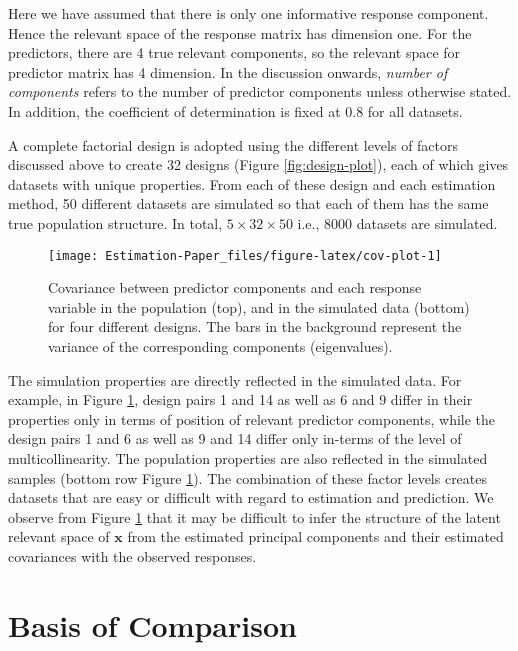 \documentclass[12pt,3p,authoryear]{elsarticle}
\begin{document}
Here we have assumed that there is only one informative response component. Hence the relevant space of the response matrix has dimension one. For the predictors, there are 4 true relevant components, so the relevant space for predictor matrix has 4 dimension. In the discussion onwards, \emph{number of components} refers to the number of predictor components unless otherwise stated. In addition, the coefficient of determination is fixed at 0.8 for all datasets.

A complete factorial design is adopted using the different levels of factors discussed above to create 32 designs (Figure \ref{fig:design-plot}), each of which gives datasets with unique properties. From each of these design and each estimation method, 50 different datasets are simulated so that each of them has the same true population structure. In total, \(5 \times 32 \times 50\) i.e., 8000 datasets are simulated.



\begin{figure}[H]
\texttt{[image: Estimation-Paper\_files/figure-latex/cov-plot-1]} \caption{Covariance between predictor components and each response variable in the population (top), and in the simulated data (bottom) for four different designs. The bars in the background represent the variance of the corresponding components (eigenvalues).}\label{fig:cov-plot}
\end{figure}

The simulation properties are directly reflected in the simulated data. For example, in Figure \ref{fig:cov-plot}, design pairs 1 and 14 as well as 6 and 9 differ in their properties only in terms of position of relevant predictor components, while the design pairs 1 and 6 as well as 9 and 14 differ only in-terms of the level of multicollinearity. The population properties are also reflected in the simulated samples (bottom row Figure \ref{fig:cov-plot}). The combination of these factor levels creates datasets that are easy or difficult with regard to estimation and prediction. We observe from Figure \ref{fig:cov-plot} that it may be difficult to infer the structure of the latent relevant space of \(\mathbf{x}\) from the estimated principal components and their estimated covariances with the observed responses.

\hypertarget{basis-of-comparison}{%
\section{Basis of Comparison}\label{basis-of-comparison}}
\end{document}
